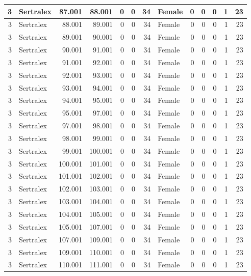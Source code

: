 \documentclass[
]{book}
\begin{document}
\begin{table}
\begin{tabular}[t]{r|l|r|r|r|r|r|l|r|r|r|r|r}
\hline
3 & Sertralex & 87.001 & 88.001 & 0 & 0 & 34 & Female & 0 & 0 & 0 & 1 & 23\\
\hline
3 & Sertralex & 88.001 & 89.001 & 0 & 0 & 34 & Female & 0 & 0 & 0 & 1 & 23\\
\hline
3 & Sertralex & 89.001 & 90.001 & 0 & 0 & 34 & Female & 0 & 0 & 0 & 1 & 23\\
\hline
3 & Sertralex & 90.001 & 91.001 & 0 & 0 & 34 & Female & 0 & 0 & 0 & 1 & 23\\
\hline
3 & Sertralex & 91.001 & 92.001 & 0 & 0 & 34 & Female & 0 & 0 & 0 & 1 & 23\\
\hline
3 & Sertralex & 92.001 & 93.001 & 0 & 0 & 34 & Female & 0 & 0 & 0 & 1 & 23\\
\hline
3 & Sertralex & 93.001 & 94.001 & 0 & 0 & 34 & Female & 0 & 0 & 0 & 1 & 23\\
\hline
3 & Sertralex & 94.001 & 95.001 & 0 & 0 & 34 & Female & 0 & 0 & 0 & 1 & 23\\
\hline
3 & Sertralex & 95.001 & 97.001 & 0 & 0 & 34 & Female & 0 & 0 & 0 & 1 & 23\\
\hline
3 & Sertralex & 97.001 & 98.001 & 0 & 0 & 34 & Female & 0 & 0 & 0 & 1 & 23\\
\hline
3 & Sertralex & 98.001 & 99.001 & 0 & 0 & 34 & Female & 0 & 0 & 0 & 1 & 23\\
\hline
3 & Sertralex & 99.001 & 100.001 & 0 & 0 & 34 & Female & 0 & 0 & 0 & 1 & 23\\
\hline
3 & Sertralex & 100.001 & 101.001 & 0 & 0 & 34 & Female & 0 & 0 & 0 & 1 & 23\\
\hline
3 & Sertralex & 101.001 & 102.001 & 0 & 0 & 34 & Female & 0 & 0 & 0 & 1 & 23\\
\hline
3 & Sertralex & 102.001 & 103.001 & 0 & 0 & 34 & Female & 0 & 0 & 0 & 1 & 23\\
\hline
3 & Sertralex & 103.001 & 104.001 & 0 & 0 & 34 & Female & 0 & 0 & 0 & 1 & 23\\
\hline
3 & Sertralex & 104.001 & 105.001 & 0 & 0 & 34 & Female & 0 & 0 & 0 & 1 & 23\\
\hline
3 & Sertralex & 105.001 & 107.001 & 0 & 0 & 34 & Female & 0 & 0 & 0 & 1 & 23\\
\hline
3 & Sertralex & 107.001 & 109.001 & 0 & 0 & 34 & Female & 0 & 0 & 0 & 1 & 23\\
\hline
3 & Sertralex & 109.001 & 110.001 & 0 & 0 & 34 & Female & 0 & 0 & 0 & 1 & 23\\
\hline
3 & Sertralex & 110.001 & 111.001 & 0 & 0 & 34 & Female & 0 & 0 & 0 & 1 & 23\\

\end{tabular}
\end{table}
\end{document}
